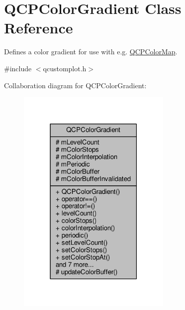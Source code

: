 \hypertarget{class_q_c_p_color_gradient}{}\section{Q\+C\+P\+Color\+Gradient Class Reference}
\label{class_q_c_p_color_gradient}


Defines a color gradient for use with e.\+g. \hyperlink{class_q_c_p_color_map}{Q\+C\+P\+Color\+Map}.  




{\ttfamily \#include $<$qcustomplot.\+h$>$}



Collaboration diagram for Q\+C\+P\+Color\+Gradient\+:\nopagebreak
\begin{figure}[H]
\begin{center}
\leavevmode
\includegraphics[width=210pt]{class_q_c_p_color_gradient__coll__graph}
\end{center}
\end{figure}
